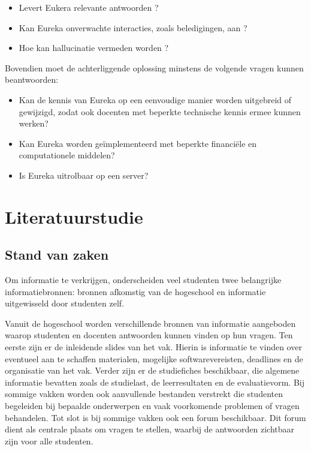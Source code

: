 \begin{itemize}
  \item Levert Eukera relevante antwoorden ? 
  \item Kan Eureka onverwachte interacties, zoals beledigingen, aan ?
  \item Hoe kan hallucinatie vermeden worden ? 
\end{itemize}

Bovendien moet de achterliggende oplossing minstens de volgende vragen kunnen beantwoorden:

\begin{itemize} \item Kan de kennis van Eureka op een eenvoudige manier worden uitgebreid of gewijzigd, zodat ook docenten met beperkte technische kennis ermee kunnen werken?
    \item Kan Eureka worden geïmplementeerd met beperkte financiële en computationele middelen?
    \item Is Eureka uitrolbaar op een server?
\end{itemize}


\section{Literatuurstudie}%
\label{sec:literatuurstudie}

\subsection{Stand van zaken}

Om informatie te verkrijgen, onderscheiden veel studenten twee belangrijke informatiebronnen: bronnen afkomstig van de hogeschool en informatie uitgewisseld door studenten zelf.

Vanuit de hogeschool worden verschillende bro\-nnen van informatie aangeboden waarop studenten en docenten antwoorden kunnen vinden op hun vragen. Ten eerste zijn er de inleidende slides van het vak. Hierin is informatie te vinden over eventueel aan te schaffen materialen, mogelijke softwarevereisten, deadlines en de organisatie van het vak. Verder zijn er de studiefiches beschikbaar, die algemene informatie bevatten zoals de studielast, de leerresultaten en de evaluatievorm. Bij sommige vakken worden ook aanvullende bestanden verstrekt die studenten begeleiden bij bepaalde onderwerpen en vaak voorkomende problemen of vragen behandelen. Tot slot is bij sommige vakken ook een forum beschikbaar. Dit forum dient als centrale plaats om vragen te stellen, waarbij de antwoorden zichtbaar zijn voor alle studenten.

